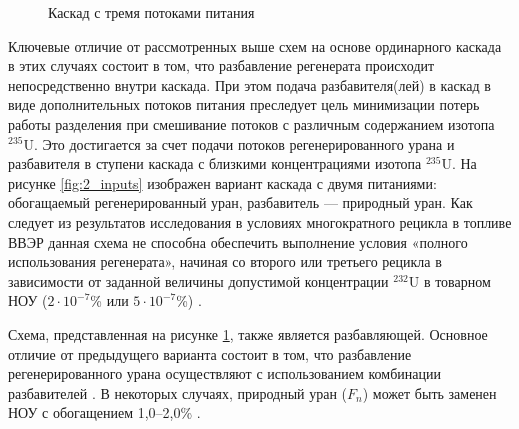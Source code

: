 \begin{figure}[ht]
  \caption{Каскад с тремя потоками питания}\label{fig:3_inputs}
\end{figure}

Ключевые отличие от рассмотренных выше схем на основе ординарного каскада в этих случаях состоит в том, что разбавление регенерата происходит непосредственно внутри каскада. При этом подача разбавителя(лей) в каскад в виде дополнительных потоков питания преследует цель минимизации потерь работы разделения при смешивание потоков с различным содержанием изотопа $^{235}$U. Это достигается за счет подачи потоков регенерированного урана и разбавителя в ступени каскада с близкими концентрациями изотопа $^{235}$U.
На рисунке \ref{fig:2_inputs} изображен вариант каскада с двумя питаниями: обогащаемый регенерированный уран, разбавитель --- природный уран. Как следует из результатов исследования \cite{smirnovEvolutionIsotopicComposition2012} в условиях многократного рецикла в топливе ВВЭР данная схема не способна обеспечить выполнение условия «полного использования регенерата», начиная со второго или третьего рецикла в зависимости от заданной величины допустимой концентрации $^{232}$U в товарном НОУ ($2\cdot10^{-7}$\% или $5\cdot10^{-7}$\%) \cite{rodionovaAnalizTehnikoekonomicheskihHarakteristik2019a,smirnovFizikotehnicheskieProblemyObogashcheniya2020}.

Схема, представленная на рисунке \ref{fig:3_inputs}, также является разбавляющей. Основное отличие от предыдущего варианта состоит в том, что разбавление регенерированного урана осуществляют с использованием комбинации разбавителей \cite{smirnovObogashchenieRegenerirovannogoUrana2014}. В некоторых случаях, природный уран ($F_n$) может быть заменен НОУ с обогащением 1,0--2,0\% \cite{smirnovObogashchenieRegenerirovannogoUrana2017}.

